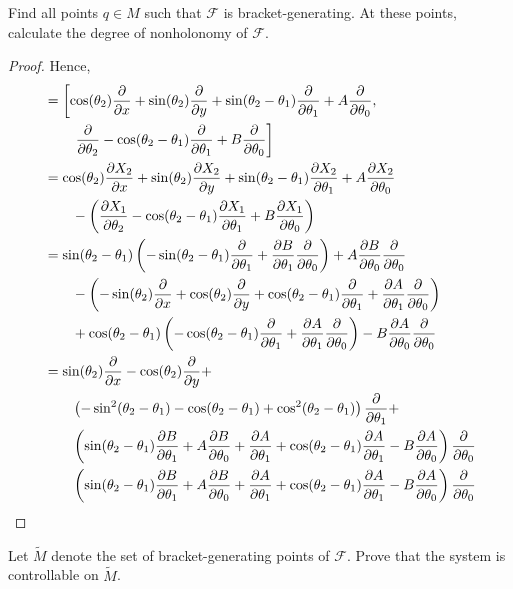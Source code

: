\documentclass{article}
\begin{document}
 Find all points $q \in M$ such that $\mathcal F$ is bracket-generating. At these points, calculate the degree of nonholonomy of $\mathcal F$.
\begin{proof}
Hence,
\begin{align*}
[X_1, X_2] & = \left[ \cos(\theta_2) \pder x  + \sin(\theta_2) \pder y  + \sin(\theta_2 - \theta_1)  \pder {\theta_1} + A \pder {\theta_0}, \right.
\\ & \quad \quad \left. \pder {\theta_2} - \cos(\theta_2 - \theta_1) \pder {\theta_1} + B \pder {\theta_0} \right]
%
\\ & = \cos(\theta_2) \pder[X_2] x  + \sin(\theta_2) \pder[X_2] y  + \sin(\theta_2 - \theta_1)  \pder[X_2] {\theta_1} + A \pder[X_2] {\theta_0}
\\ & \quad \quad - \left( \pder[X_1] {\theta_2} - \cos(\theta_2 - \theta_1) \pder [X_1] {\theta_1} + B \pder[X_1] {\theta_0} \right)
%
\\ & =  \sin(\theta_2 - \theta_1) \left( -\sin(\theta_2 - \theta_1) \pder {\theta_1} + \pder[B] {\theta_1} \pder {\theta_0} \right) + A \pder[B] {\theta_0} \pder {\theta_0}
\\ & \quad \quad - \left( -\sin(\theta_2) \pder x + \cos(\theta_2) \pder y + \cos (\theta_2 - \theta_1) \pder {\theta_1} + \pder[A] {\theta_1} \pder {\theta_0} \right) 
\\ & \quad \quad + \cos(\theta_2 - \theta_1) \left( -\cos(\theta_2 - \theta_1) \pder {\theta_1} + \pder[A] {\theta_1} \pder {\theta_0} \right) - B \pder[A] {\theta_0} \pder {\theta_0}
%
\\ & = \sin(\theta_2) \pder x  - \cos(\theta_2) \pder y + 
\\ & \quad \quad \left(- \sin^2(\theta_2 - \theta_1) - \cos (\theta_2 - \theta_1) + \cos^2(\theta_2 - \theta_1) \right) \pder {\theta_1} + 
\\ & \quad \quad \left(  \sin (\theta_2 - \theta_1) \pder[B] {\theta_1}  + A \pder[B] {\theta_0} +  \pder[A]{\theta_1} + \cos(\theta_2 - \theta_1) \pder[A] {\theta_1} - B \pder[A]{\theta_0} \right) \pder {\theta_0}
\\ & \quad \quad \left(  \sin (\theta_2 - \theta_1) \pder[B] {\theta_1}  + A \pder[B] {\theta_0} +  \pder[A]{\theta_1} + \cos(\theta_2 - \theta_1) \pder[A] {\theta_1} - B \pder[A]{\theta_0} \right) \pder {\theta_0}

\end{align*}

\end{proof}


 Let $\widetilde M$ denote the set of bracket-generating points of $\mathcal F$. Prove that the system is controllable on $\widetilde M$.
\end{document}
